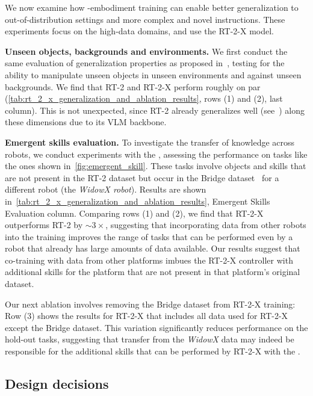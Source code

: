 We now examine how \cro-embodiment training can enable better generalization to out-of-distribution settings and more complex and novel instructions. These experiments focus on the high-data domains, and use the RT-2-X model.

\textbf{Unseen objects, backgrounds and environments.} 
We first conduct the same evaluation of generalization properties as proposed in~\cite{brohan2023rt2}, testing for the ability to manipulate unseen objects in unseen environments and against unseen backgrounds.
We find that RT-2 and RT-2-X perform roughly on par (\cref{tab:rt_2_x_generalization_and_ablation_results}, rows (1) and (2), last column). This is not unexpected, since RT-2 already generalizes well (see~\cite{brohan2023rt2}) along these dimensions due to its VLM backbone.

\textbf{Emergent skills evaluation.}
To investigate the transfer of knowledge across robots, we conduct experiments with the \edrbot, assessing the performance on tasks like the ones shown in~\cref{fig:emergent_skill}. These tasks involve objects and skills that are not present in the RT-2 dataset but occur in the Bridge dataset~\cite{walke2023bridgedata} for a different robot (the \textit{WidowX robot}).
Results are shown in~\cref{tab:rt_2_x_generalization_and_ablation_results}, Emergent Skills Evaluation column. Comparing rows (1) and (2), we find that RT-2-X outperforms RT-2 by  $\sim3\times$, suggesting that  incorporating data from other robots into the training improves the range of tasks that can be performed even by a robot that already has large amounts of data available. 
Our results suggest that co-training with data from other platforms imbues the RT-2-X controller with additional skills for the platform that are not present in that platform's original dataset. 

Our next ablation involves removing the Bridge dataset from RT-2-X training: Row (3) shows the results for RT-2-X that includes all data used for RT-2-X except the Bridge dataset. This variation significantly reduces performance on the hold-out tasks, suggesting that transfer from the \textit{WidowX} data may indeed be responsible for the additional skills that can be performed by RT-2-X with the \edrbot.

\vspace{-0.4em}
\subsection{Design decisions} 
\vspace{-0.25em}

